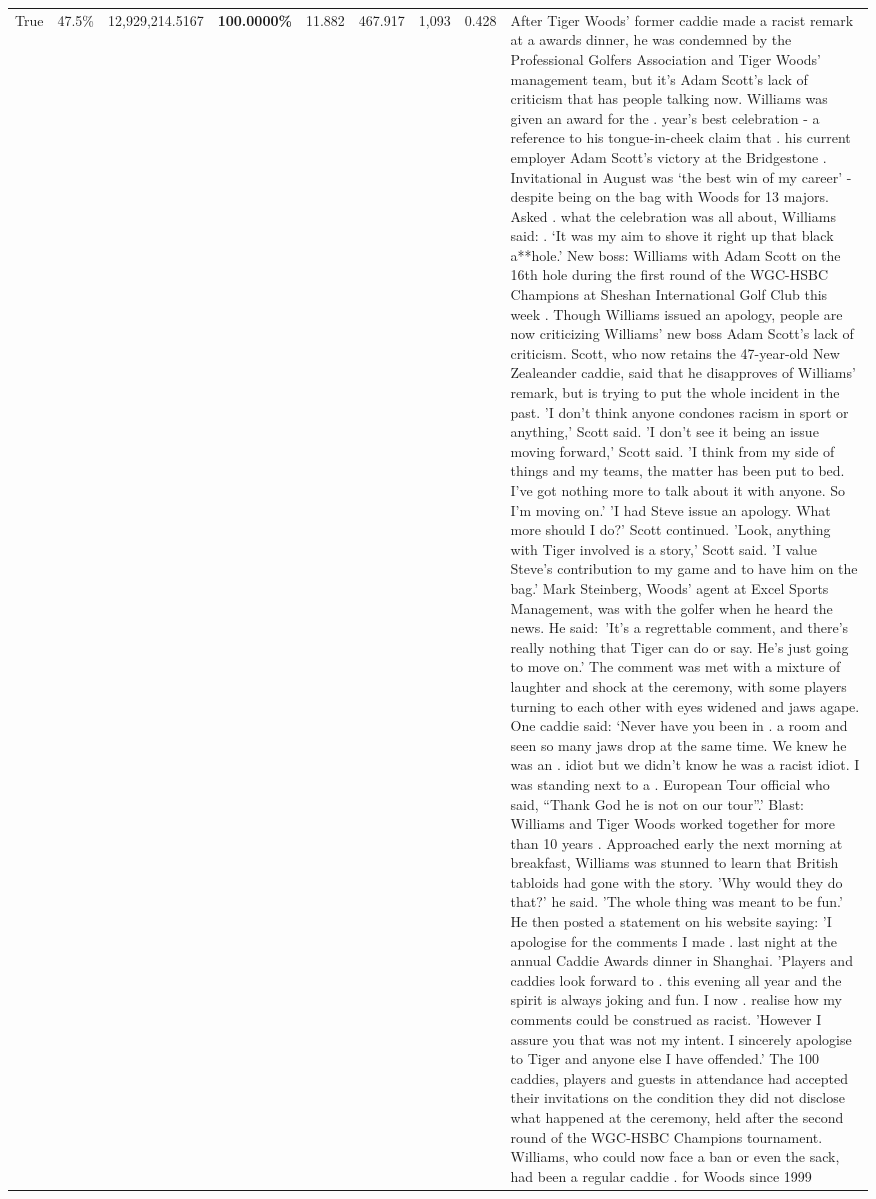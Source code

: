 \begin{table}[H]
\begin{tabular}{lllrlllll}
True & 47.5\% & 12,929,214.5167 & \bfseries \color{red} 100.0000\% & 11.882 & 467.917 & 1,093 & 0.428 & After Tiger Woods' former caddie made a racist remark at a awards dinner, he was condemned by the Professional Golfers Association and Tiger Woods' management team, but it's Adam Scott's lack of criticism that has people talking now. Williams was given an award for the . year’s best celebration - a reference to his tongue-in-cheek claim that . his current employer Adam Scott’s victory at the Bridgestone . Invitational in August was ‘the best win of my career’ - despite being on the bag with Woods for 13 majors. Asked . what the celebration was all about, Williams said: . ‘It was my aim to shove it right up that black a**hole.’ New boss: Williams with Adam Scott  on the 16th hole during the first round of the WGC-HSBC Champions at Sheshan International Golf Club this week . Though Williams issued an apology, people are now criticizing Williams' new boss Adam Scott's lack of criticism. Scott, who now retains the 47-year-old New Zealeander caddie, said that he disapproves of Williams' remark, but is trying to put the whole incident in the past. 'I don't think anyone condones racism in sport or anything,' Scott said. 'I don't see it being an issue moving forward,' Scott said. 'I think from my side of things and my teams, the matter has been put to bed. I've got nothing more to talk about it with anyone. So I'm moving on.' 'I had Steve issue an apology. What more should I do?' Scott continued. 'Look, anything with Tiger involved is a story,' Scott said. 'I value Steve's contribution to my game and to have him on the bag.' Mark Steinberg, Woods' agent at Excel Sports Management, was with the golfer when he heard the news. He said: 'It's a regrettable comment, and there's really nothing that Tiger can do or say. He's just going to move on.' The comment was met with a mixture of laughter and shock at the ceremony, with some players turning to each other with eyes widened and jaws agape. One caddie said: ‘Never have you been in . a room and seen so many jaws drop at the same time. We knew he was an . idiot but we didn’t know he was a racist idiot. I was standing next to a . European Tour official who said, “Thank God he is not on our tour”.’ Blast: Williams and Tiger Woods worked together for more than 10 years . Approached early the next morning at breakfast, Williams was stunned to learn that British tabloids had gone with the story. 'Why would they do that?' he said. 'The whole thing was meant to be fun.' He then posted a statement on his website saying: 'I apologise for the comments I made . last night at the annual Caddie Awards dinner in Shanghai. 'Players and caddies look forward to . this evening all year and the spirit is always joking and fun. I now . realise how my comments could be construed as racist. 'However I assure you that was not my intent. I sincerely apologise to Tiger and anyone else I have offended.' The 100 caddies, players and guests in attendance had accepted their invitations on the condition they did not disclose what happened at the ceremony, held after the second round of the WGC-HSBC Champions tournament. Williams, who could now face a ban or even the sack, had been a regular caddie . for Woods since 1999 
\end{tabular}
\end{table}
